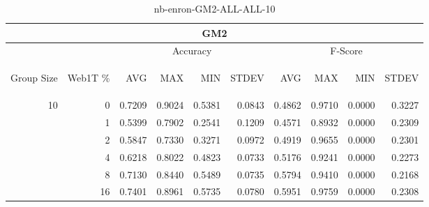 \begin{center}
\begin{table}[htbp]
\begin{tabular}{ | r | r | r | r | r | r | r | r | r | r |}
\hline
\multicolumn{10}{|c|}{GM2}\\
\hline
 & & \multicolumn{4}{|c|}{Accuracy} & \multicolumn{4}{|c|}{F-Score}\\ \cline{3-10}
\begin{sideways}Group Size\end{sideways} & \begin{sideways}Web1T \%\end{sideways} & \begin{sideways}AVG\end{sideways} & \begin{sideways}MAX\end{sideways} & \begin{sideways}MIN\end{sideways} & \begin{sideways}STDEV\end{sideways} & \begin{sideways}AVG\end{sideways} & \begin{sideways}MAX\end{sideways} & \begin{sideways}MIN\end{sideways} & \begin{sideways}STDEV\end{sideways}\\
\hline
\multirow{5}{*}{10}
 & 0 & 0.7209 & 0.9024 & 0.5381 & 0.0843 & 0.4862 & 0.9710 & 0.0000 & 0.3227\\ \cline{2-10}
 & 1 & 0.5399 & 0.7902 & 0.2541 & 0.1209 & 0.4571 & 0.8932 & 0.0000 & 0.2309\\ \cline{2-10}
 & 2 & 0.5847 & 0.7330 & 0.3271 & 0.0972 & 0.4919 & 0.9655 & 0.0000 & 0.2301\\ \cline{2-10}
 & 4 & 0.6218 & 0.8022 & 0.4823 & 0.0733 & 0.5176 & 0.9241 & 0.0000 & 0.2273\\ \cline{2-10}
 & 8 & 0.7130 & 0.8440 & 0.5489 & 0.0735 & 0.5794 & 0.9410 & 0.0000 & 0.2168\\ \cline{2-10}
 & 16 & 0.7401 & 0.8961 & 0.5735 & 0.0780 & 0.5951 & 0.9759 & 0.0000 & 0.2308\\ \cline{2-10}
\hline
\end{tabular}
\caption{nb-enron-GM2-ALL-ALL-10}
\label{table:nb-enron-GM2-ALL-ALL-10}
\end{table}
\end{center}

